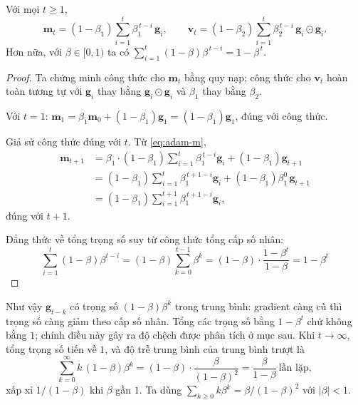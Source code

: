 \begin{proposition}\label{prop:adam-expand}
Với mọi $t\ge 1$,
\begin{equation}\label{eq:adam-expand}
  \mathbf{m}_t=(1-\beta_1)\sum_{i=1}^{t}\beta_1^{\,t-i}\,\mathbf{g}_i,
  \qquad
  \mathbf{v}_t=(1-\beta_2)\sum_{i=1}^{t}\beta_2^{\,t-i}\,\mathbf{g}_i\odot\mathbf{g}_i .
\end{equation}
Hơn nữa, với $\beta\in[0,1)$ ta có $\displaystyle\sum_{i=1}^{t}(1-\beta)\beta^{\,t-i}=1-\beta^{\,t}$.
\end{proposition}

\begin{proof}
Ta chứng minh công thức cho $\mathbf{m}_t$ bằng quy nạp; công thức cho $\mathbf{v}_t$ hoàn toàn tương tự với $\mathbf{g}_i$ thay bằng $\mathbf{g}_i\odot\mathbf{g}_i$ và $\beta_1$ thay bằng $\beta_2$.

Với $t=1$: $\mathbf{m}_1=\beta_1\mathbf{m}_0+(1-\beta_1)\mathbf{g}_1=(1-\beta_1)\mathbf{g}_1$, đúng với công thức.

Giả sử công thức đúng với $t$. Từ \eqref{eq:adam-m},
\begin{align*}
  \mathbf{m}_{t+1}&=\beta_1\cdot(1-\beta_1)\sum_{i=1}^{t}\beta_1^{\,t-i}\mathbf{g}_i+(1-\beta_1)\mathbf{g}_{t+1}\\
  &=(1-\beta_1)\sum_{i=1}^{t}\beta_1^{\,t+1-i}\mathbf{g}_i+(1-\beta_1)\beta_1^{0}\,\mathbf{g}_{t+1}\\
  &=(1-\beta_1)\sum_{i=1}^{t+1}\beta_1^{\,t+1-i}\mathbf{g}_i,
\end{align*}
đúng với $t+1$.

Đẳng thức về tổng trọng số suy từ công thức tổng cấp số nhân:
\begin{equation*}
    \sum_{i=1}^{t} (1-\beta) \beta^{t-i} 
    = (1-\beta) \sum_{k=0}^{t-1} \beta^{k} 
    = (1-\beta) \cdot \frac{1-\beta^{t}}{1-\beta} 
    = 1-\beta^{t} 
\end{equation*}
\end{proof}

Như vậy $\mathbf{g}_{t-k}$ có trọng số $(1-\beta)\beta^{k}$ trong trung bình: gradient càng cũ thì trọng số càng giảm theo cấp số nhân. Tổng các trọng số bằng $1-\beta^{t}$ chứ không bằng $1$; chính điều này gây ra độ chệch được phân tích ở mục sau. Khi $t\to\infty$, tổng trọng số tiến về $1$, và độ trễ trung bình của trung bình trượt là
\begin{equation}\label{eq:adam-memory}
  \sum_{k=0}^{\infty}k\,(1-\beta)\beta^{k}=(1-\beta)\cdot\frac{\beta}{(1-\beta)^{2}}=\frac{\beta}{1-\beta}\ \text{lần lặp},
\end{equation}
xấp xỉ $1/(1-\beta)$ khi $\beta$ gần $1$. Ta dùng $\sum_{k\ge0}k\beta^{k}=\beta/(1-\beta)^{2}$ với $|\beta|<1$.

